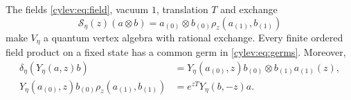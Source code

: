 \begin{theorem}\label{cylev:thm:fields}
The fields \eqref{cylev:eq:field}, vacuum $1$, translation $T$ and
exchange
\begin{equation}\label{cylev:eq:exchange}
 \mathcal S_\eta(z)(a\otimes b)
       =a_{(0)}\otimes b_{(0)}\rho_z(a_{(1)},b_{(1)})
\end{equation}
make $V_\eta$ a quantum vertex algebra with rational exchange.
Every finite ordered field product on a fixed state has a common
germ in \eqref{cylev:eq:germs}. Moreover,
\begin{align}
 \delta_\eta(Y_\eta(a,z)b)
 &=Y_\eta(a_{(0)},z)b_{(0)}\otimes b_{(1)}a_{(1)}(z),
       \label{cylev:eq:covariance}\\
 Y_\eta(a_{(0)},z)b_{(0)}\rho_z(a_{(1)},b_{(1)})
 &=e^{zT}Y_\eta(b,-z)a.
       \label{cylev:eq:skew}
\end{align}
\end{theorem}
